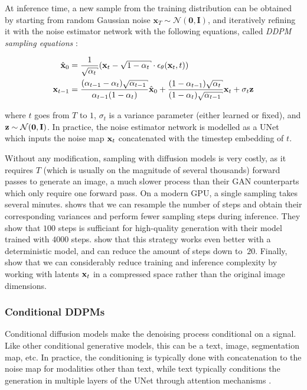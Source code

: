 
At inference time, a new sample from the training distribution can be obtained by starting from 
random Gaussian noise $\mathbf{x}_T \sim \mathcal{N}(\mathbf{0}, \mathbf{I})$, and iteratively
refining it with the noise estimator network with the following equations, called 
\textit{DDPM sampling equations} \citep{ho2020denoising}:

\begin{align*}
      \hat{\x}_0 &= \frac{1}{\sqrt{\alpha_t}}(\x_t - \sqrt{1 - \alpha_t} \cdot \epsilon_\theta(\x_t, t)) \\
      \x_{t-1} &= \frac{(\alpha_{t-1}-\alpha_t) \sqrt{\alpha_{t-1}}}{\alpha_{t-1}(1 - \alpha_t)} \hat{\x}_0 + \frac{(1-\alpha_{t-1})\sqrt{\alpha_t}}{(1 - \alpha_t)\sqrt{\alpha_{t-1}}} \x_t + \sigma_t \z
\end{align*}

where $t$ goes from $T$ to $1$, 
$\sigma_t$ is a variance parameter (either learned or fixed), and $\mathbf{z} \sim \mathcal{N}(\mathbf{0}, \mathbf{I})$.
In practice, the noise estimator network is modelled as a UNet \citep{ronneberger2015UNet} 
which inputs the noise map $\mathbf{x}_t$ concatenated with the timestep embedding of $t$. 


Without any modification, sampling with diffusion models is very costly, as it requires $T$
(which is usually on the magnitude of several thousands) forward passes to generate an image, a much slower 
process than their \ac{GAN} counterparts which only require one forward pass. On a modern 
GPU, a single sampling takes several minutes. \cite{nichol2021improved} shows that we can 
resample the number of steps and obtain their corresponding variances and perform fewer 
sampling steps during inference. They show that $100$  steps is sufficiant for high-quality 
generation with their model trained with $4000$ steps. \cite{song2021denoising} show that 
this strategy works even better with a deterministic model, and can reduce the amount of steps
down to $~20$. Finally, \cite{rombach2022high} show that we can considerably reduce training and 
inference complexity by working with latents $\mathbf{x}_t$ in a compressed space rather than 
the original image dimensions.

\subsubsection{Conditional DDPMs}\label{subsection:conditional_ddpm}

Conditional diffusion models \citep{chen2021wavegrad, saharia2022image, saharia2022palette}
make the denoising process conditional on a signal. Like other conditional generative models, 
this can be  a text, image, segmentation map, etc. In practice, the conditioning is 
typically done with concatenation to the noise map for modalities other than text, 
while text typically conditions the generation in multiple layers of the 
UNet through attention mechanisms \citep{nichol2021glide, rombach2022high, saharia2022photorealistic}.

